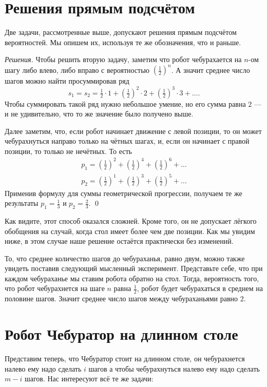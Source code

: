 \documentclass{article}
\begin{document}
\section{Решения прямым подсчётом}

Две задачи, рассмотренные выше, допускают решения прямым подсчётом вероятностей. 
Мы опишем их, используя те же обозначения, что и раньше.

\medskip
\noindent\textit{Решения.}
Чтобы решить вторую задачу, 
заметим что робот чебурахается на $n$-ом шагу либо влево, либо вправо с вероятностью $(\tfrac12)^n$.
А значит среднее число шагов можно найти просуммировав ряд
\[s_1=s_2=\tfrac12\cdot1+(\tfrac12)^2\cdot 2+(\tfrac12)^3\cdot 3+\dots.\]
Чтобы суммировать такой ряд нужно небольшое умение, 
но его сумма равна $2$ --- и не удивительно, что то же значение было получено выше.

Далее заметим, что, если робот начинает движение с левой позиции, 
то он может чебурахнуться направо только на чётных шагах, 
и, если он начинает с правой позиции, то только не нечётных.
То есть
\begin{align*}
p_1=(\tfrac12)^2+(\tfrac12)^4+(\tfrac12)^6+\dots
\\
p_2=(\tfrac12)^1+(\tfrac12)^3+(\tfrac12)^5+\dots
\end{align*}
Применив формулу для суммы геометрической прогрессии, получаем те же результаты $p_1=\tfrac13$ и $p_2=\tfrac23$.
\qed
\medskip

Как видите, этот способ оказался сложней.
Кроме того, он не допускает лёгкого обобщения на случай, когда стол имеет более чем две позиции.
Как мы увидим ниже, 
в этом случае наше решение остаётся практически без изменений.

То, что среднее количество шагов до чебураханья,
равно двум, можно также увидеть поставив следующий мысленный эксперимент.
Представьте себе, что при каждом чебураханье 
мы ставим робота обратно на стол.
Тогда, вероятность того, что робот чебурахнется на шаге $n$
равна $\tfrac12$, робот будет чебурахаться в среднем на половине шагов.
Значит среднее число шагов между чебураханьями равно 2.


\section{Робот Чебуратор на длинном столе} 

Представим теперь, что Чебуратор стоит на длинном столе,
он чебурахнется налево ему надо сделать $i$ шагов
а чтобы чебурахнуться налево ему надо сделать $m-i$ шагов.
Нас интересуют всё те же задачи:
\end{document}
